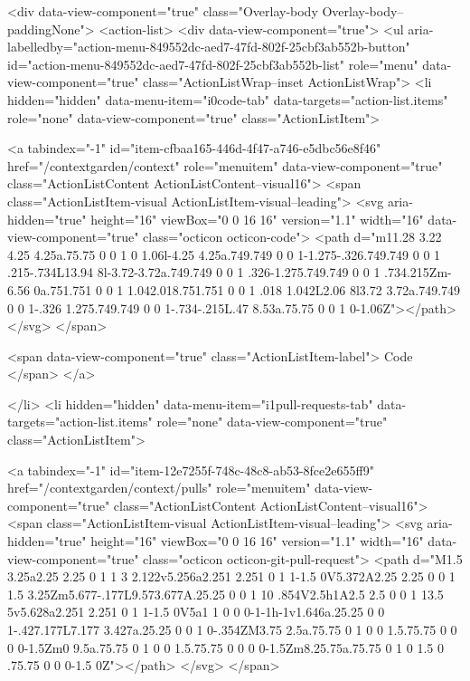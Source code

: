      <div data-view-component="true" class="Overlay-body Overlay-body--paddingNone">          <action-list>
  <div data-view-component="true">
    <ul aria-labelledby="action-menu-849552dc-aed7-47fd-802f-25cbf3ab552b-button" id="action-menu-849552dc-aed7-47fd-802f-25cbf3ab552b-list" role="menu" data-view-component="true" class="ActionListWrap--inset ActionListWrap">
        <li hidden="hidden" data-menu-item="i0code-tab" data-targets="action-list.items" role="none" data-view-component="true" class="ActionListItem">
    
    
    <a tabindex="-1" id="item-cfbaa165-446d-4f47-a746-e5dbc56e8f46" href="/contextgarden/context" role="menuitem" data-view-component="true" class="ActionListContent ActionListContent--visual16">
        <span class="ActionListItem-visual ActionListItem-visual--leading">
          <svg aria-hidden="true" height="16" viewBox="0 0 16 16" version="1.1" width="16" data-view-component="true" class="octicon octicon-code">
    <path d="m11.28 3.22 4.25 4.25a.75.75 0 0 1 0 1.06l-4.25 4.25a.749.749 0 0 1-1.275-.326.749.749 0 0 1 .215-.734L13.94 8l-3.72-3.72a.749.749 0 0 1 .326-1.275.749.749 0 0 1 .734.215Zm-6.56 0a.751.751 0 0 1 1.042.018.751.751 0 0 1 .018 1.042L2.06 8l3.72 3.72a.749.749 0 0 1-.326 1.275.749.749 0 0 1-.734-.215L.47 8.53a.75.75 0 0 1 0-1.06Z"></path>
</svg>
        </span>
      
        <span data-view-component="true" class="ActionListItem-label">
          Code
</span>      
</a>
  
</li>
        <li hidden="hidden" data-menu-item="i1pull-requests-tab" data-targets="action-list.items" role="none" data-view-component="true" class="ActionListItem">
    
    
    <a tabindex="-1" id="item-12e7255f-748c-48c8-ab53-8fce2e655ff9" href="/contextgarden/context/pulls" role="menuitem" data-view-component="true" class="ActionListContent ActionListContent--visual16">
        <span class="ActionListItem-visual ActionListItem-visual--leading">
          <svg aria-hidden="true" height="16" viewBox="0 0 16 16" version="1.1" width="16" data-view-component="true" class="octicon octicon-git-pull-request">
    <path d="M1.5 3.25a2.25 2.25 0 1 1 3 2.122v5.256a2.251 2.251 0 1 1-1.5 0V5.372A2.25 2.25 0 0 1 1.5 3.25Zm5.677-.177L9.573.677A.25.25 0 0 1 10 .854V2.5h1A2.5 2.5 0 0 1 13.5 5v5.628a2.251 2.251 0 1 1-1.5 0V5a1 1 0 0 0-1-1h-1v1.646a.25.25 0 0 1-.427.177L7.177 3.427a.25.25 0 0 1 0-.354ZM3.75 2.5a.75.75 0 1 0 0 1.5.75.75 0 0 0 0-1.5Zm0 9.5a.75.75 0 1 0 0 1.5.75.75 0 0 0 0-1.5Zm8.25.75a.75.75 0 1 0 1.5 0 .75.75 0 0 0-1.5 0Z"></path>
</svg>
        </span>
      
